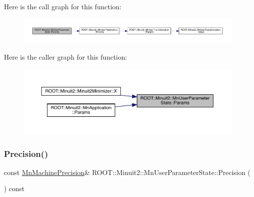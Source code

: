 Here is the call graph for this function\+:
\nopagebreak
\begin{figure}[H]
\begin{center}
\leavevmode
\includegraphics[width=350pt]{d3/de0/classROOT_1_1Minuit2_1_1MnUserParameterState_af9ed845d2a223223497414296477889f_cgraph}
\end{center}
\end{figure}
Here is the caller graph for this function\+:
\nopagebreak
\begin{figure}[H]
\begin{center}
\leavevmode
\includegraphics[width=350pt]{d3/de0/classROOT_1_1Minuit2_1_1MnUserParameterState_af9ed845d2a223223497414296477889f_icgraph}
\end{center}
\end{figure}
\mbox{\label{classROOT_1_1Minuit2_1_1MnUserParameterState_aff32da1a78b79f578541e42e91e37563}} 
\subsubsection{\texorpdfstring{Precision()}{Precision()}\hspace{0.1cm}{\footnotesize\ttfamily [1/3]}}
{\footnotesize\ttfamily const \mbox{\hyperlink{classROOT_1_1Minuit2_1_1MnMachinePrecision}{Mn\+Machine\+Precision}}\& R\+O\+O\+T\+::\+Minuit2\+::\+Mn\+User\+Parameter\+State\+::\+Precision (\begin{DoxyParamCaption}{ }\end{DoxyParamCaption}) const}

\mbox{\label{classROOT_1_1Minuit2_1_1MnUserParameterState_a03f90db04e5573afaef3865d0d87b85b}} 
